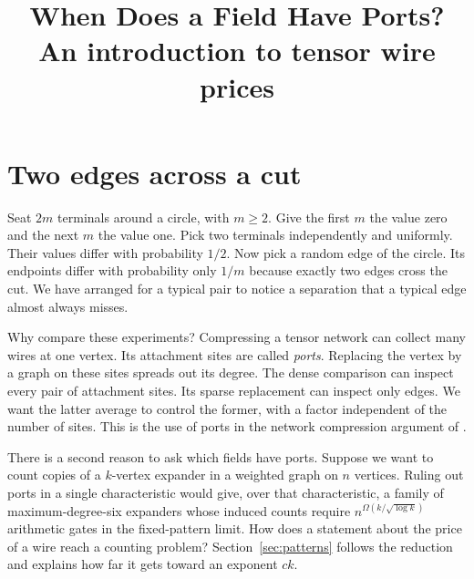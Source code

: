 \documentclass[11pt]{article}
\title{When Does a Field Have Ports?\\
An introduction to tensor wire prices}
\author{}
\theoremstyle{definition}
\begin{document}
\maketitle

\section{Two edges across a cut}
\label{sec:cycle}

Seat \(2m\) terminals around a circle, with \(m\ge2\). Give the first \(m\) the value zero
and the next \(m\) the value one. Pick two terminals independently and
uniformly. Their values differ with probability \(1/2\). Now pick a random
edge of the circle. Its endpoints differ with probability only \(1/m\)
because exactly two edges cross the cut. We have arranged for a typical pair to
notice a separation that a typical edge almost always misses.

\begin{center}
\end{center}

Why compare these experiments? Compressing a tensor network can collect many
wires at one vertex. Its attachment sites are called \emph{ports}. Replacing
the vertex by a graph on these sites spreads out its degree. The dense
comparison can inspect every pair of attachment sites. Its sparse
replacement can inspect only edges. We want the latter average to control
the former, with a factor independent of the number of sites.
This is the use of ports in the network compression argument of
\cite{euclid}.

There is a second reason to ask which fields have ports. Suppose we want
to count copies of a \(k\)-vertex expander in a weighted graph on \(n\)
vertices. Ruling out ports in a single characteristic would give, over
that characteristic, a family of maximum-degree-six expanders whose
induced counts require \(n^{\Omega(k/\sqrt{\log k})}\) arithmetic gates
in the fixed-pattern limit. How does a statement about the price of a
wire reach a counting problem? Section~\ref{sec:patterns} follows the
reduction and explains how far it gets toward an exponent \(ck\).
\end{document}
